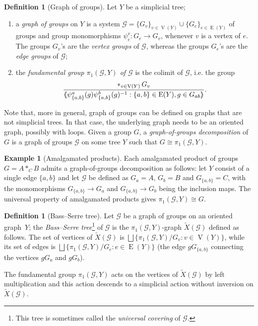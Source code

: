 \documentclass[svgnames]{amsart}
\theoremstyle{plain}
\theoremstyle{definition}
\newtheorem{defn}[thm]{Definition}
\newtheorem{ex}[thm]{Example}
\newcommand{\edge}[1]{\operatorname{E}(#1)}
\DeclareMathOperator*{\free}{\ast}
\DeclarePairedDelimiter{\nspan}{\langle\mkern-5mu\langle}{\rangle\mkern-5mu\rangle}
\newcommand{\ver}[1]{\operatorname{V}(#1)}
\begin{document}
\begin{defn}[Graph of groups]
    Let $Y$ be a simplicial tree;
    \begin{enumerate}
        \item a \emph{graph of groups} on $Y$ is a system $\mathcal G = \{G_v\}_{v\in\ver Y}\cup\{G_e\}_{e\in\edge Y}$ of groups and group monomorphisms $\psi_e^v\colon G_e\to G_{v}$, whenever $v$ is a vertex of $e$. The groups $G_v$'s are the \emph{vertex groups} of $\mathcal G$, whereas the groups $G_e$'s are the \emph{edge groups} of $\mathcal G$;
        \item the \emph{fundamental group $\pi_1(\mathcal G,Y)$ of $\mathcal G$} is the colimit of $\mathcal G$, i.e. the group 
        \[
        \frac{\free_{v\in\ver Y}G_v}{\nspan{\psi_{\{a,b\}}^a(g)\psi_{\{a,b\}}^b(g)^{-1}:\{a,b\}\in\edge Y, g\in G_{ab}}}.
        \]
    \end{enumerate}
\end{defn}
\noindent Note that, more in general, graph of groups can be defined on graphs that are not simplicial trees. In that case, the underlying graph needs to be an oriented graph, possibly with loops.  Given a group $G$, a \emph{graph-of-groups decomposition} of $G$ is a graph of groups $\mathcal G$ on some tree $Y$ such that $G\cong \pi_1(\mathcal G,Y)$. 

\begin{ex}[Amalgamated products]
    \label{ex:amalgProd}
    Each amalgamated product of groups $G=A*_CB$ admits a graph-of-groups decomposition as follows: let $Y$ consist of a single edge $\{a,b\}$ and let $\mathcal G$ be defined as $G_a=A$, $G_b=B$ and $G_{\{a,b\}}=C$, with the monomorphisms $G_{\{a,b\}}\to G_a$ and $G_{\{a,b\}}\to G_b$ being the inclusion maps. The universal property of amalgamated products gives $\pi_1(\mathcal G,Y)\cong G$.
\end{ex}

\begin{defn}[Bass--Serre tree]
    Let $\mathcal G$ be a graph of groups on an oriented graph~$Y$; the \emph{Bass--Serre tree}\footnote{This tree is sometimes called the \emph{universal covering} of $\mathcal G$.} of $\mathcal G$ is the $\pi_1(\mathcal G,Y)$-graph $\tilde X(\mathcal G)$ defined as follows. The set of vertices of $\tilde X(\mathcal G)$ is $\bigsqcup\{\pi_1(\mathcal G,Y)/G_v:v\in\ver Y\}$, while its set of edges is $\bigsqcup\{\pi_1(\mathcal G,Y)/G_e:e\in\edge Y\}$ (the edge $gG_{\{a,b\}}$ connecting the vertices $gG_a$ and $gG_b$).\par
    
    The fundamental group $\pi_1(\mathcal G,Y)$ acts on the vertices of $\tilde X(\mathcal G)$ by left multiplication and this action descends to a simplicial action without inversion on $\tilde X(\mathcal G)$.
\end{defn}
\end{document}

